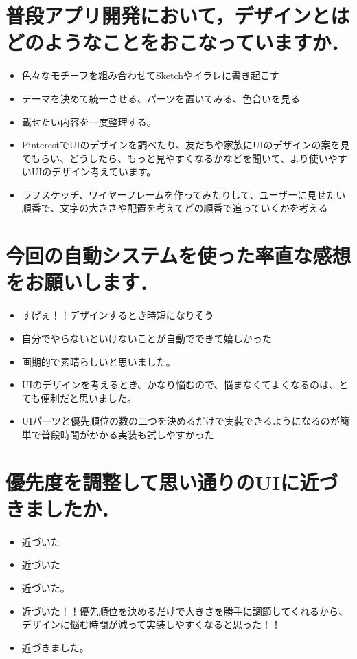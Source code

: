 \section{普段アプリ開発において，デザインとはどのようなことをおこなっていますか．}
\begin{itemize}
	\item 色々なモチーフを組み合わせてSketchやイラレに書き起こす
	\item テーマを決めて統一させる、パーツを置いてみる、色合いを見る
	\item 載せたい内容を一度整理する。
	\item PinterestでUIのデザインを調べたり、友だちや家族にUIのデザインの案を見てもらい、どうしたら、もっと見やすくなるかなどを聞いて、より使いやすいUIのデザイン考えています。
	\item ラフスケッチ、ワイヤーフレームを作ってみたりして、ユーザーに見せたい順番で、文字の大きさや配置を考えてどの順番で追っていくかを考える
\end{itemize}

\section{今回の自動システムを使った率直な感想をお願いします．}
\begin{itemize}
	\item すげぇ！！デザインするとき時短になりそう
	\item 自分でやらないといけないことが自動でできて嬉しかった
	\item 画期的で素晴らしいと思いました。
	\item UIのデザインを考えるとき、かなり悩むので、悩まなくてよくなるのは、とても便利だと思いました。
	\item UIパーツと優先順位の数の二つを決めるだけで実装できるようになるのが簡単で普段時間がかかる実装も試しやすかった
\end{itemize}

\section{優先度を調整して思い通りのUIに近づきましたか．}
\begin{itemize}
	\item 近づいた
	\item 近づいた
	\item 近づいた。
	\item 近づいた！！優先順位を決めるだけで大きさを勝手に調節してくれるから、デザインに悩む時間が減って実装しやすくなると思った！！
	\item 近づきました。
\end{itemize}

